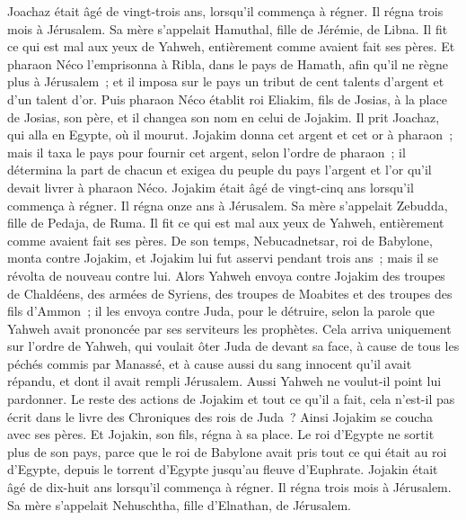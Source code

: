 \begin{multicols}{2}
Joachaz était âgé de vingt-trois ans, lorsqu'il commença à régner. Il régna trois mois à Jérusalem. Sa mère s'appelait Hamuthal, fille de Jérémie, de Libna.
Il fit ce qui est mal aux yeux de Yahweh, entièrement comme avaient fait ses pères.
Et pharaon Néco l'emprisonna à Ribla, dans le pays de Hamath, afin qu'il ne règne plus à Jérusalem~; et il imposa sur le pays un tribut de cent talents d'argent et d'un talent d'or.
Puis pharaon Néco établit roi Eliakim, fils de Josias, à la place de Josias, son père, et il changea son nom en celui de Jojakim. Il prit Joachaz, qui alla en Egypte, où il mourut.
Jojakim donna cet argent et cet or à pharaon~; mais il taxa le pays pour fournir cet argent, selon l'ordre de pharaon~; il détermina la part de chacun et exigea du peuple du pays l'argent et l'or qu'il devait livrer à pharaon Néco.
Jojakim était âgé de vingt-cinq ans lorsqu'il commença à régner. Il régna onze ans à Jérusalem. Sa mère s'appelait Zebudda, fille de Pedaja, de Ruma.
Il fit ce qui est mal aux yeux de Yahweh, entièrement comme avaient fait ses pères.
\VerseOne{}De son temps, Nebucadnetsar, roi de Babylone, monta contre Jojakim, et Jojakim lui fut asservi pendant trois ans~; mais il se révolta de nouveau contre lui.
Alors Yahweh envoya contre Jojakim des troupes de Chaldéens, des armées de Syriens, des troupes de Moabites et des troupes des fils d'Ammon~; il les envoya contre Juda, pour le détruire, selon la parole que Yahweh avait prononcée par ses serviteurs les prophètes.
Cela arriva uniquement sur l'ordre de Yahweh, qui voulait ôter Juda de devant sa face, à cause de tous les péchés commis par Manassé,
et à cause aussi du sang innocent qu'il avait répandu, et dont il avait rempli Jérusalem. Aussi Yahweh ne voulut-il point lui pardonner.
Le reste des actions de Jojakim et tout ce qu'il a fait, cela n'est-il pas écrit dans le livre des Chroniques des rois de Juda~?
Ainsi Jojakim se coucha avec ses pères. Et Jojakin, son fils, régna à sa place.
Le roi d'Egypte ne sortit plus de son pays, parce que le roi de Babylone avait pris tout ce qui était au roi d'Egypte, depuis le torrent d'Egypte jusqu'au fleuve d'Euphrate.
Jojakin était âgé de dix-huit ans lorsqu'il commença à régner. Il régna trois mois à Jérusalem. Sa mère s'appelait Nehuschtha, fille d'Elnathan, de Jérusalem.

\end{multicols}
